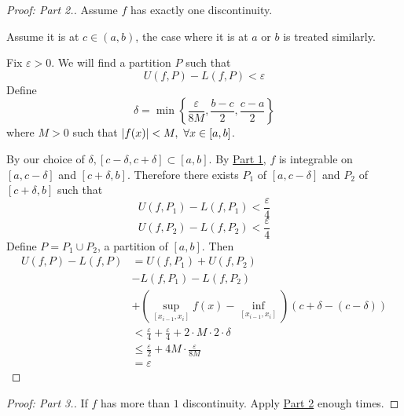 \documentclass[12pt]{report}
\begin{document}
    \label{Part 2}
    \begin{proof}[Proof: Part \textnormal{2.}]
        Assume \(f\) has exactly one discontinuity.

        Assume it is at \(c \in (a,b)\), the case where it is at \(a\) or \(b\) is treated similarly.

        Fix \(\varepsilon > 0\). We will find a partition \(P\) such that
        \[U(f,P) - L(f,P) < \varepsilon\]
        Define
        \[\delta = \min \left\{\frac{\varepsilon}{8M}, \frac{b-c}{2}, \frac{c-a}{2}\right\}\]
        where \(M >0\) such that \(\left| f(x) \right| < M, ~ \forall x \in [a,b]\).

        By our choice of \(\delta, [c - \delta, c + \delta] \subset [a,b]\). By \hyperref[Part 1.]{Part 1}, \(f\) is integrable on \([a,c -\delta]\) and \([c+\delta, b]\). Therefore there exists \(P_1\) of \([a, c - \delta]\) and \(P_2\) of \([c+ \delta, b]\) such that
        \[U(f,P_1) - L(f,P_1) < \frac{\varepsilon}{4}\]
        \[U(f,P_2) - L(f,P_2) < \frac{\varepsilon}{4}\]
        Define \(P = P_1 \cup P_2\), a partition of \([a,b]\). Then
        \begin{align*}
            U(f,P) - L(f,P) &= U(f,P_1) + U(f,P_2) \\
            &- L(f,P_1) - L(f,P_2) \\
            &+ \left(\underset{[x_{i-1}, x_i]}{\sup} f(x) - \underset{[x_{i-1}, x_i]}{\inf}\right)(c + \delta - (c - \delta))\\
            &< \frac{\varepsilon}{4} + \frac{\varepsilon}{4} +2 \cdot M \cdot 2 \cdot \delta\\
            &\leq \frac{\varepsilon}{2} + 4M \cdot \frac{\varepsilon}{8M}\\
            &= \varepsilon
        \end{align*}
    \end{proof}
    \begin{proof}[Proof: Part \textnormal{3}.]
        If \(f\) has more than \(1\) discontinuity. Apply \hyperref[Part 2]{Part 2} enough times.
    \end{proof}
\end{document}
